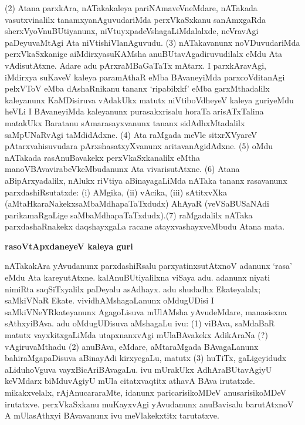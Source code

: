 (2) Atana parxkAra, nATakakaleya pariNAmaveVneMdare, nATakada vasutxvinalilx tanamxya\-nAguvudariMda perxVkaSxkanu sanAmxgaRda sherxVyoVnuBUtiyanunx, niVtuyxpadeVshagaLiMdalalxde, neVravAgi paDeyuvaMtAgi Ata niVtishiVlanAguvudu. (3) nATakavanunx noVDuvuda\-riMda perxVkaSxkanige aiMdirxyasuKAMsha anuBUtavAgadiruvudilalx eMdu Ata vAdisu\-tAtxne. Adare adu pArxraMBaGaTaTx mAtarx. I parxkAravAgi, iMdirxya suKaveV kaleya paramAthaR eMba BAvaneyiMda parxcoVditanAgi pelxVToV eMba dAshaRnikanu tananx `ripabilxkf' eMba garxMthadalilx kaleyanunx KaMDisiruva vAdakUkx matutx niVtiboVdheyeV kaleya guriyeMdu heVLi I BAvaneyiMda kaleyanunx purasakxrisalu horaTa arisATxTa\-lina matakUkx Baratanu sAmarasayxvanunx tananx sidAdhxMtadalilx saMpUNaRvAgi taMdidAdxne. (4) Ata raMgada meVle sitxrXVyareV pAtarxvahisuvudara pArxshasatxyXvanunx aritavanAgidAdxne. (5) oMdu nATakada rasAnuBavakekx perxVkaSxkanalilx eMtha manoVBAvavirabeVkeMbu\-danunx Ata vivarisutAtxne. (6) Atana aBipArxyadalilx, nAlukx riVtiya aBinayagaLiMda nATaka tananx rasavanunx parxdashiRsutatxde: {\rm(i)} AMgika, {\rm(ii)} vAcika, {\rm(iii)} sAtitxvXka (aMtaHkaraNakekx\break saMbaMdhapaTaTxdudx) AhAyaR (veVSaBUSaNAdi parikamaRgaLige saMbaMdhapaTaTxdudx).\break (7) raMgadalilx nATaka parxdashaRnakekx daqshayxgaLa racane atayxvashayxveMbudu Atana mata.

\smallskip
\begin{center}
{\Large\bf rasoVtApxdaneyeV kaleya guri}
\end{center}

nATakakAra yAvudanunx parxdashiRsalu parxyatinxsutAtxnoV adanunx `rasa' eMdu Ata kareyutAtxne. kalAnuBUtiyalilxna viSaya adu. adanunx niyati nimiRta saqSiTxyalilx paDeyalu asAdhayx. adu shudadhx Ekateyalalx; saMkiVNaR Ekate. vividhAMshagaLanunx oMdugUDisi I saMkiVNeYRkateyanunx AgagoLisuva mUlAMsha yAvudeMdare, manasisxna sAthxyiBAva. adu oMdugUDisuva aMshagaLu ivu: (1) viBAva, saMdaBaR matutx vayxkitxgaLiMda utapxnanxvAgi mUlaBAvakekx AdikAraNa (?) vAgiruvaMthadu (2) anuBAva, eMdare, aMtaraMgada BAvagaLanunx bahiraMgapaDisuva aBinayAdi kirxyegaLu, matutx (3) huTiTx, gaLigeyidudx aLiduhoVguva vayxBicAriBAvagaLu. ivu mUrakUkx AdhAraBUtavAgiyU keVMdarx biMduvAgiyU mUla citatxvaqtitx athavA BAva irutatxde. mikakxvelalx, rAjAnucararaMte, idanunx paricarisikoMDeV anusarisikoMDeV irutatxve. perxVkaSxkanu muKayxvAgi yAvudanunx anuBavisalu barutAtxnoV A mUlasAthxyi BAvavanunx ivu meVlakekxtitx tarutatxve.

